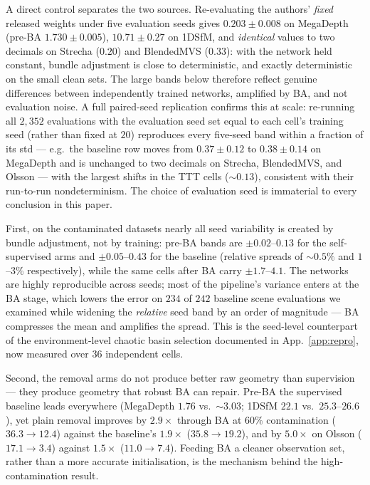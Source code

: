\documentclass[10pt,twocolumn,letterpaper]{article}
\begin{document}
A direct control separates the two sources. Re-evaluating the authors' \emph{fixed}
released weights under five evaluation seeds gives $0.203\pm0.008$ on MegaDepth
(pre-BA $1.730\pm0.005$), $10.71\pm0.27$ on 1DSfM, and \emph{identical} values to two
decimals on Strecha ($0.20$) and BlendedMVS ($0.33$): with the network held constant,
bundle adjustment is close to deterministic, and exactly deterministic on the small
clean sets. The large bands below therefore reflect genuine differences between
independently trained networks, amplified by BA, and not evaluation noise. A full
paired-seed replication confirms this at scale: re-running all $2{,}352$ evaluations with
the evaluation seed set equal to each cell's training seed (rather than fixed at $20$)
reproduces every five-seed band within a fraction of its std --- e.g.\ the baseline row
moves from $0.37\pm0.12$ to $0.38\pm0.14$ on MegaDepth and is unchanged to two decimals
on Strecha, BlendedMVS, and Olsson --- with the largest shifts in the TTT cells
($\sim\!0.13$), consistent with their run-to-run nondeterminism. The choice of
evaluation seed is immaterial to every conclusion in this paper.

First, on the contaminated datasets nearly all seed variability is created by bundle
adjustment, not by training: pre-BA bands are $\pm0.02$--$0.13$ for the self-supervised
arms and $\pm0.05$--$0.43$ for the baseline (relative spreads of ${\sim}0.5\%$ and
$1$--$3\%$ respectively), while the same cells after BA carry $\pm1.7$--$4.1$. The
networks are highly reproducible across seeds; most of the pipeline's variance enters at
the BA stage, which lowers the error on $234$ of $242$ baseline scene evaluations we
examined while widening the \emph{relative} seed band by an order of magnitude --- BA
compresses the mean and amplifies the spread. This is the seed-level counterpart of the
environment-level chaotic basin selection documented in App.~\ref{app:repro}, now
measured over $36$ independent cells.

Second, the removal arms do not produce better raw geometry than supervision --- they
produce geometry that robust BA can repair. Pre-BA the supervised baseline leads
everywhere (MegaDepth $1.76$ vs.\ ${\sim}3.03$; 1DSfM $22.1$ vs.\ $25.3$--$26.6$), yet
plain removal improves by $2.9\times$ through BA at $60\%$ contamination
($36.3\to12.4$) against the baseline's $1.9\times$ ($35.8\to19.2$), and by $5.0\times$
on Olsson ($17.1\to3.4$) against $1.5\times$ ($11.0\to7.4$). Feeding BA a cleaner
observation set, rather than a more accurate initialisation, is the mechanism behind the
high-contamination result.
\end{document}
